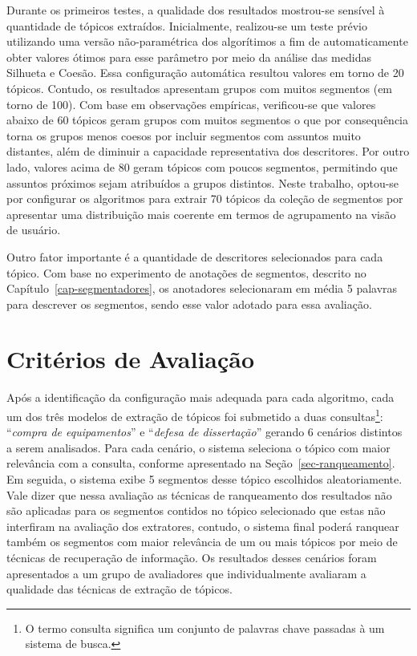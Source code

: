 Durante os primeiros testes, a qualidade dos resultados mostrou-se sensível à quantidade de tópicos extraídos.
Inicialmente, realizou-se um teste prévio utilizando uma versão não-paramétrica dos algorítimos a fim de automaticamente obter valores ótimos para esse parâmetro por meio da análise das medidas Silhueta e Coesão. Essa configuração automática resultou valores em torno de 20 tópicos. Contudo, os resultados apresentam grupos com muitos segmentos (em torno de 100).
Com base em observações empíricas, verificou-se que valores abaixo de 60 tópicos geram grupos com muitos segmentos o que por consequência torna os grupos menos coesos por incluir segmentos com assuntos muito distantes, além de diminuir a capacidade representativa dos descritores. Por outro lado, valores acima de 80 geram tópicos com poucos segmentos, permitindo que assuntos próximos sejam atribuídos a grupos distintos. Neste trabalho, optou-se por configurar os algoritmos para extrair 70 tópicos da coleção de segmentos por apresentar uma distribuição mais coerente em termos de agrupamento na visão de usuário.

Outro fator importante é a quantidade de descritores selecionados para cada tópico. Com base no experimento de anotações de segmentos, descrito no Capítulo~\ref{cap-segmentadores}, os anotadores selecionaram em média 5 palavras para descrever os segmentos, sendo esse valor adotado para essa avaliação.




\section{Critérios de Avaliação}

Após a identificação da configuração mais adequada para cada algoritmo, cada um dos três modelos de extração de tópicos foi submetido a duas consultas\footnote{O termo consulta significa um conjunto de palavras chave passadas à um sistema de busca.}: ``\textit{compra de equipamentos}'' e ``\textit{defesa de dissertação}'' gerando 6 cenários distintos a serem analisados. 
Para cada cenário, o sistema seleciona o tópico com maior relevância com a consulta, conforme apresentado na Seção~\ref{sec-ranqueamento}.
Em seguida, o sistema exibe 5 segmentos desse tópico escolhidos aleatoriamente. 
Vale dizer que nessa avaliação as técnicas de ranqueamento dos resultados não são aplicadas para os segmentos contidos no tópico selecionado que estas não interfiram na avaliação dos extratores, contudo, o sistema final poderá ranquear também os segmentos com maior relevância de um ou mais tópicos por meio de técnicas de recuperação de informação. 
Os resultados desses cenários foram apresentados a um grupo de avaliadores que individualmente avaliaram a qualidade das técnicas de extração de tópicos. 
%

